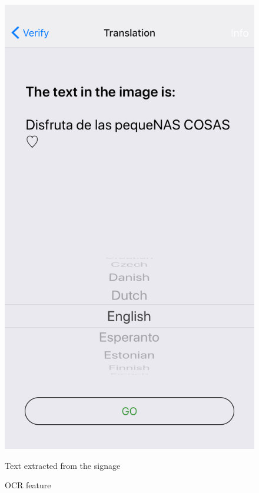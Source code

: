 \documentclass[12pt]{article}
\begin{document}
\begin{figure} [H]
\begin{minipage}{.5\textwidth}
  \label{fig:case3in}
\end{minipage}%
\begin{minipage}{.5\textwidth}
  \centering
  \includegraphics[width=0.9\linewidth]{media/case3.PNG}
  \caption{OCR feature}{Text extracted from the signage}
  \label{fig:case3}
\end{minipage}
\end{figure}
\end{document}
